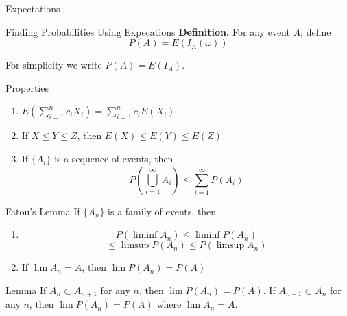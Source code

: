\documentclass{article}
\begin{document}
\begin{multicols*}{3}
\begin{blackbox}{Expectations}
    \begin{bluebox}{Finding Probabilities Using Expecations}
        \textbf{Definition.} For any event $A$, define 
        \[P(A) = E(I_A(\omega))\]
        \raggedright
        For simplicity we write $P(A) = E(I_A)$.
        \begin{redbox}{Properties}
            \begin{enumerate}[label=(\roman*)]
                \item $E\left(\sum\limits_{i=1}^n c_iX_i\right) = \sum\limits_{i=1}^n c_iE(X_i)$
                \item If $X \leq Y \leq Z$, then $E(X) \leq E(Y) \leq E(Z)$
                \item If $\{A_i\}$ is a sequence of events, then 
                \[P\left(\bigcup_{i=1}^\infty A_i\right) \leq \sum_{i=1}^\infty P(A_i)\]
            \end{enumerate}
        \end{redbox}
    \end{bluebox}
    \begin{brownbox}{Fatou's Lemma}
        If $\{A_n\}$ is a family of events, then 
        \raggedright
        \begin{enumerate}
            \item $$P(\liminf A_n) \leq \liminf P(A_n) $$
            \[\leq \limsup P(A_n) \leq P(\limsup A_n)\]
            \item If $\lim A_n = A$, then $\lim P(A_n) = P(A)$
        \end{enumerate}
    \end{brownbox}
    \begin{pinkbox}{Lemma}
        If $A_n \subset A_{n+1}$ for any $n$, then $\lim P(A_n) = P(A)$. If $A_{n+1} \subset A_n$ for any $n$, then $\lim P(A_n) = P(A)$ where $\lim A_n = A$. 
    \end{pinkbox}
\end{blackbox}
\end{multicols*}
\end{document}

